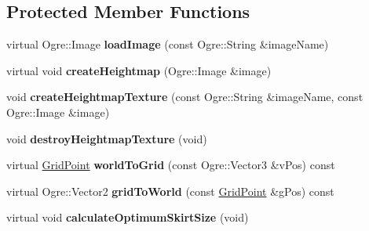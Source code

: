 \subsection*{Protected Member Functions}
\begin{DoxyCompactItemize}
\item 
\mbox{\label{class_terrain_a54f91ef044931634522b62bdcb692e3f}} 
virtual Ogre\+::\+Image {\bfseries load\+Image} (const Ogre\+::\+String \&image\+Name)
\item 
\mbox{\label{class_terrain_aac07c957e4dda6deaca7c1924f58cb99}} 
virtual void {\bfseries create\+Heightmap} (Ogre\+::\+Image \&image)
\item 
\mbox{\label{class_terrain_a36055197e9913fba0b3a6ef7ed35a01d}} 
void {\bfseries create\+Heightmap\+Texture} (const Ogre\+::\+String \&image\+Name, const Ogre\+::\+Image \&image)
\item 
\mbox{\label{class_terrain_a30772767fde11e818ff80a0d60be2283}} 
void {\bfseries destroy\+Heightmap\+Texture} (void)
\item 
\mbox{\label{class_terrain_af53bde3d676e2627132f65e70527f900}} 
virtual \hyperlink{struct_grid_point}{Grid\+Point} {\bfseries world\+To\+Grid} (const Ogre\+::\+Vector3 \&v\+Pos) const
\item 
\mbox{\label{class_terrain_a3ded300819839623b59f9d4c8809b8cd}} 
virtual Ogre\+::\+Vector2 {\bfseries grid\+To\+World} (const \hyperlink{struct_grid_point}{Grid\+Point} \&g\+Pos) const
\item 
\mbox{\label{class_terrain_a1446e1ac3b4d31613fdb82b38c6e055f}} 
virtual void {\bfseries calculate\+Optimum\+Skirt\+Size} (void)
\end{DoxyCompactItemize}
